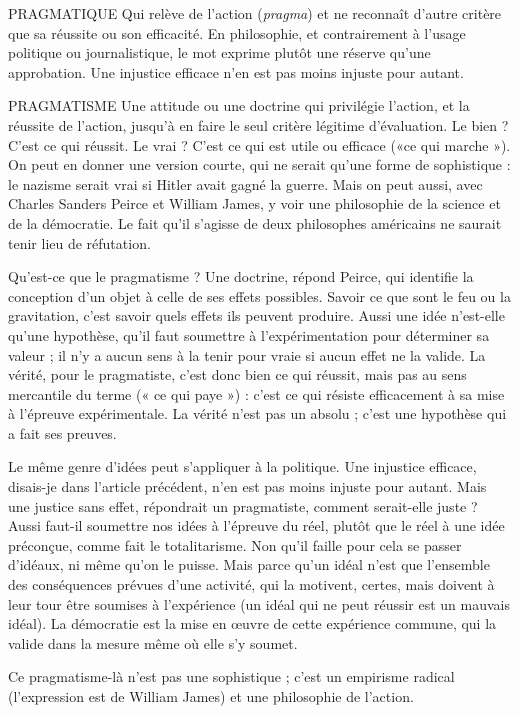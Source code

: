 PRAGMATIQUE Qui relève de l’action ({\it pragma}) et ne reconnaît d’autre
critère que sa réussite ou son efficacité. En philosophie,
et contrairement à l’usage politique ou journalistique, le mot exprime plutôt
une réserve qu’une approbation. Une injustice efficace n’en est pas moins
injuste pour autant.

PRAGMATISME Une attitude ou une doctrine qui privilégie l’action, et la
réussite de l’action, jusqu’à en faire le seul critère légitime
d'évaluation. Le bien ? C’est ce qui réussit. Le vrai ? C’est ce qui est utile ou
efficace («ce qui marche »). On peut en donner une version courte, qui ne
serait qu’une forme de sophistique : le nazisme serait vrai si Hitler avait gagné
la guerre. Mais on peut aussi, avec Charles Sanders Peirce et William James, y
voir une philosophie de la science et de la démocratie. Le fait qu’il s'agisse de
deux philosophes américains ne saurait tenir lieu de réfutation.

Qu'est-ce que le pragmatisme ? Une doctrine, répond Peirce, qui identifie
la conception d’un objet à celle de ses effets possibles. Savoir ce que sont le feu
ou la gravitation, c’est savoir quels effets ils peuvent produire. Aussi une idée
n'est-elle qu’une hypothèse, qu’il faut soumettre à l'expérimentation pour
déterminer sa valeur ; il n’y a aucun sens à la tenir pour vraie si aucun effet ne
la valide. La vérité, pour le pragmatiste, c’est donc bien ce qui réussit, mais pas
au sens mercantile du terme (« ce qui paye ») : c’est ce qui résiste efficacement
à sa mise à l'épreuve expérimentale. La vérité n’est pas un absolu ; c'est une
hypothèse qui a fait ses preuves.

Le même genre d’idées peut s'appliquer à la politique. Une injustice efficace,
disais-je dans l’article précédent, n’en est pas moins injuste pour autant.
Mais une justice sans effet, répondrait un pragmatiste, comment serait-elle
juste ? Aussi faut-il soumettre nos idées à l’épreuve du réel, plutôt que le réel à
une idée préconçue, comme fait le totalitarisme. Non qu’il faille pour cela se
passer d’idéaux, ni même qu’on le puisse. Mais parce qu’un idéal n’est que
l’ensemble des conséquences prévues d’une activité, qui la motivent, certes,
mais doivent à leur tour être soumises à l’expérience (un idéal qui ne peut
réussir est un mauvais idéal). La démocratie est la mise en œuvre de cette expérience
commune, qui la valide dans la mesure même où elle s’y soumet.

Ce pragmatisme-là n’est pas une sophistique ; c’est un empirisme radical
(l'expression est de William James) et une philosophie de l’action.


